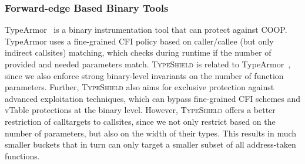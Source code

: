 
\subsubsection{Forward-edge Based Binary Tools}

TypeArmor~\cite{veen:typearmor} is a binary instrumentation tool that can protect against COOP.
TypeArmor uses a fine-grained CFI policy based on caller/callee (but only indirect callsites) matching, which checks 
during runtime if the number of provided and needed parameters match.
\textsc{TypeShield} is related to TypeArmor~\cite{veen:typearmor}, since we also enforce strong binary-level 
invariants on the number of function parameters. Further, \textsc{TypeShield} also aims for exclusive protection 
against advanced exploitation techniques, which can bypass fine-grained CFI schemes and vTable protections at the 
binary level. However, \textsc{TypeShield} offers a better restriction of calltargets to callsites, since we not 
only restrict based on the number of parameters, but also on the width of their types. This results in much smaller 
buckets that in turn can only target a smaller subset of all address-taken functions. 

